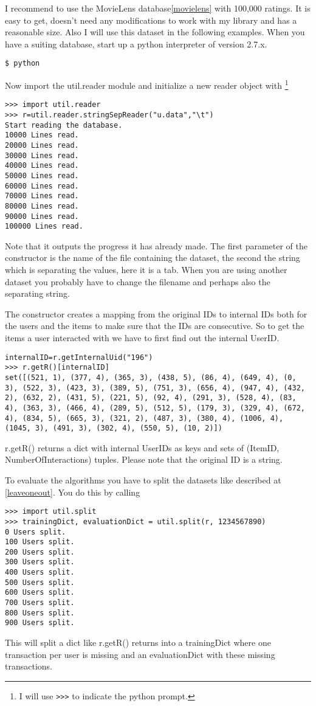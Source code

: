 I recommend to use the MovieLens database\ref{movielens} with 100,000 ratings.
It is easy to get, doesn't need any modifications to work with my library and has a
reasonable size. Also I will use this dataset in the following examples.
When you have a suiting database, start up a python interpreter of version 2.7.x.
\begin{lstlisting}
$ python
\end{lstlisting}
Now import the util.reader module and initialize a new reader object with
\footnote{I will use \lstinline!>>>! to indicate the python prompt.}
\begin{lstlisting}
>>> import util.reader
>>> r=util.reader.stringSepReader("u.data","\t")
Start reading the database.
10000 Lines read.
20000 Lines read.
30000 Lines read.
40000 Lines read.
50000 Lines read.
60000 Lines read.
70000 Lines read.
80000 Lines read.
90000 Lines read.
100000 Lines read.
\end{lstlisting}
Note that it outputs the progress it has already made.
The first parameter of the constructor is the name of the file containing the dataset,
the second the string which is separating the values, here it is a tab. 
When you are using another dataset you probably have to change the filename and perhaps
also the separating string.

The constructor creates a mapping from the original IDs to internal IDs both for the users
and the items to make sure that the IDs are consecutive. So to get the items a user interacted
with we have to first find out the internal UserID.
\begin{lstlisting}
internalID=r.getInternalUid("196")
>>> r.getR()[internalID]
set([(521, 1), (377, 4), (365, 3), (438, 5), (86, 4), (649, 4), (0, 3), (522, 3), (423, 3), (389, 5), (751, 3), (656, 4), (947, 4), (432, 2), (632, 2), (431, 5), (221, 5), (92, 4), (291, 3), (528, 4), (83, 4), (363, 3), (466, 4), (289, 5), (512, 5), (179, 3), (329, 4), (672, 4), (834, 5), (665, 3), (321, 2), (487, 3), (380, 4), (1006, 4), (1045, 3), (491, 3), (302, 4), (550, 5), (10, 2)])
\end{lstlisting}
r.getR() returns a dict with internal UserIDs as keys and sets of (ItemID, NumberOfInteractions) tuples.
Please note that the original ID is a string.

To evaluate the algorithms you have to split the datasets like described at \ref{leaveoneout}.
You do this by calling
\begin{lstlisting}
>>> import util.split
>>> trainingDict, evaluationDict = util.split(r, 1234567890)
0 Users split.
100 Users split.
200 Users split.
300 Users split.
400 Users split.
500 Users split.
600 Users split.
700 Users split.
800 Users split.
900 Users split.
\end{lstlisting}
This will split a dict like r.getR() returns into a trainingDict where one transaction
per user is missing and an evaluationDict with these missing transactions.


